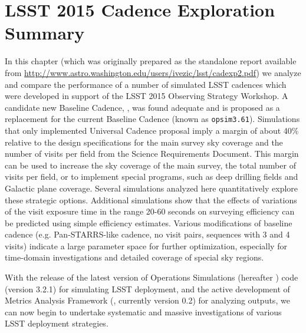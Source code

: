 
\chapter[LSST 2015 Cadence Exploration]{LSST 2015 Cadence Exploration Summary}
\def\chpname{cadence2015}\label{chp:\chpname}



 In this chapter (which was originally prepared
as the standalone report available from
\url{http://www.astro.washington.edu/users/ivezic/lsst/cadexp2.pdf})
we analyze and compare the performance of a number of simulated LSST
cadences which were developed in support of the LSST 2015 Observing
Strategy Workshop.  A candidate new Baseline Cadence,
, was found adequate and is proposed as  a
replacement for the current Baseline Cadence (known as
\texttt{opsim3.61}). Simulations that only implemented Universal
Cadence proposal imply a margin of about 40\% relative to the design
specifications for the main survey sky coverage and the number of
visits per field from the Science Requirements Document. This margin
can be used to increase the sky coverage of the main survey, the total
number of visits per field, or to implement special programs, such as
deep drilling fields and Galactic plane coverage. Several  simulations
analyzed here quantitatively explore these strategic options.
Additional simulations show that the effects of variations of the
visit exposure time in the  range 20-60 seconds on surveying
efficiency can be predicted using simple efficiency estimates. Various
modifications of baseline cadence (e.g. Pan-STARRS-like cadence,  no
visit pairs, sequences with 3 and 4 visits) indicate a large parameter
space for further optimization, especially for time-domain
investigations and detailed coverage of special sky regions.

With the release of the latest version of Operations Simulations
(hereafter \OpSim) code (version 3.2.1)  for simulating LSST
deployment, and the active development of Metrics Analysis Framework
(\MAF,  currently version 0.2) for analyzing \OpSim outputs, we can
now begin to undertake systematic and  massive investigations of
various LSST deployment strategies.

